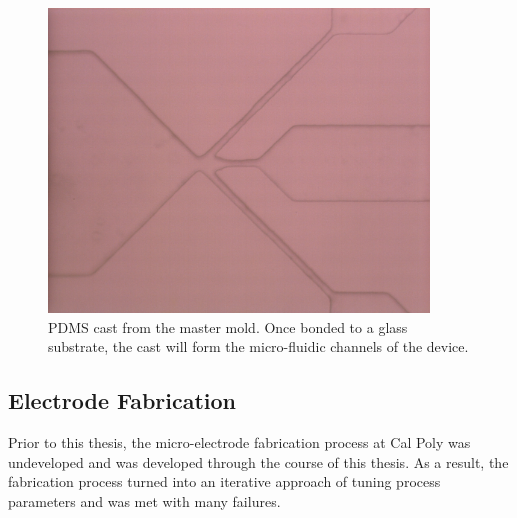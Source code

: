 \begin{figure}[H]
    \centering
    \includegraphics[width=0.9\textwidth]{images/PDMS_channels.png}
    \caption{PDMS cast from the master mold. Once bonded to a glass substrate, the cast will form the micro-fluidic channels of the device.}
    \label{fig:pdms_results}
\end{figure}

\FloatBarrier


\subsection{Electrode Fabrication}

\par Prior to this thesis, the micro-electrode fabrication process at Cal Poly was undeveloped and was developed through the course of this thesis. As a result, the fabrication process turned into an iterative approach of tuning process parameters and was met with many failures.

